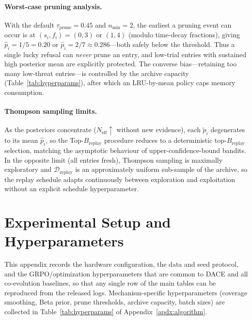 \documentclass{article}
\newcommand{\method}{\textsc{DACE}\xspace}
\begin{document}
\paragraph{Worst-case pruning analysis.}
With the default $\tau_{\mathrm{prune}}=0.45$ and $n_{\min}=2$, the earliest a pruning event can occur is at $(s_i, f_i)=(0, 3)$ or $(1, 4)$ (modulo time-decay fractions), giving $\hat p_i = 1/5=0.20$ or $\hat p_i=2/7\approx 0.286$---both safely below the threshold. Thus a single lucky refusal can \emph{never} prune an entry, and low-trial entries with sustained high posterior mean are explicitly protected. The converse bias---retaining too many low-threat entries---is controlled by the archive capacity (Table~\ref{tab:hyperparams}), after which an LRU-by-mean policy caps memory consumption.

\paragraph{Thompson sampling limits.}
As the posteriors concentrate ($N_{\mathrm{eff}} \uparrow$ without new evidence), each $\tilde p_i$ degenerates to its mean $\hat p_i$, so the Top-$B_{\mathrm{replay}}$ procedure reduces to a deterministic top-$B_{\mathrm{replay}}$ selection, matching the asymptotic behaviour of upper-confidence-bound bandits. In the opposite limit (all entries fresh), Thompson sampling is maximally exploratory and $\mathcal{D}_{\mathrm{replay}}$ is an approximately uniform sub-sample of the archive, so the replay schedule adapts continuously between exploration and exploitation without an explicit schedule hyperparameter.


\section{Experimental Setup and Hyperparameters}
\label{apdx:training-setup}

This appendix records the hardware configuration, the data and seed protocol, and the GRPO/optimization hyperparameters that are common to \method and all co-evolution baselines, so that any single row of the main tables can be reproduced from the released logs. Mechanism-specific hyperparameters (coverage smoothing, Beta prior, prune thresholds, archive capacity, batch sizes) are collected in Table~\ref{tab:hyperparams} of Appendix~\ref{apdx:algorithm}.
\end{document}
